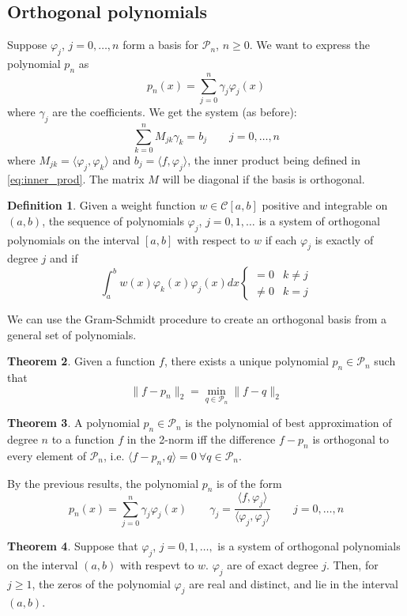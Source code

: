 \documentclass[12pt, openany]{report}
\theoremstyle{definition}
\newtheorem{thm}{Theorem}[chapter]
\newtheorem{definition}[thm]{Definition}
\begin{document}
\subsection{Orthogonal polynomials}
Suppose $\varphi_j$, $j=0,\dots,n$ form a basis for $\mathcal{P}_n$, $n\ge0$. We want to express the polynomial $p_n$ as 
\begin{equation}
    p_n(x) = \sum_{j=0}^n \gamma_j\varphi_j(x)
\end{equation}
where $\gamma_j$ are the coefficients. We get the system (as before):
\begin{equation}
    \sum_{k=0}^n M_{jk}\gamma_k = b_j \qquad j=0,\dots,n
\end{equation}
where $M_{jk} = \langle \varphi_j,\varphi_k\rangle$ and $b_j = \langle f,\varphi_j\rangle$, the inner product being defined in \eqref{eq:inner_prod}. The matrix $M$ will be diagonal if the basis is orthogonal. 
\begin{definition}
    Given a weight function $w\in \mathcal{C}[a,b]$ positive and integrable on $(a,b)$, the sequence of polynomials $\varphi_j$, $j=0,1,\dots$ is a system of orthogonal polynomials on the interval $[a,b]$ with respect to $w$ if each $\varphi_j$ is exactly of degree $j$ and if 
    \begin{equation}
        \int_a^b w(x)\varphi_k(x)\varphi_j(x) dx \begin{cases}
            = 0 & k\neq j\\
            \neq 0 & k=j
        \end{cases}
    \end{equation}
\end{definition}
We can use the Gram-Schmidt procedure to create an orthogonal basis from a general set of polynomials. 
\begin{thm}
    Given a function $f$, there exists a unique polynomial $p_n\in \mathcal{P}_n$ such that
    \begin{equation}
        \lVert f-p_n\rVert_2 = \min_{q\in \mathcal{P}_n} \lVert f-q\rVert_2
    \end{equation}
\end{thm}
\begin{thm}
    A polynomial $p_n\in \mathcal{P}_n$ is the polynomial of best approximation of degree $n$ to a function $f$ in the 2-norm iff the difference $f-p_n$ is orthogonal to every element of $\mathcal{P}_n$, i.e. $\langle f-p_n,q\rangle = 0\:\forall q\in \mathcal{P}_n$. 
\end{thm}
By the previous results, the polynomial $p_n$ is of the form 
\begin{equation}
    p_n(x) = \sum_{j=0}^n \gamma_j\varphi_j(x) \qquad \gamma_j = \frac{\langle f,\varphi_j\rangle}{\langle \varphi_j,\varphi_j\rangle} \qquad j=0,\dots,n
\end{equation}
\begin{thm}
    Suppose that $\varphi_j$, $j=0,1,\dots,$ is a system of orthogonal polynomials on the interval $(a,b)$ with respevt to $w$. $\varphi_j$ are of exact degree $j$. Then, for $j\ge1$, the zeros of the polynomial $\varphi_j$ are real and distinct, and lie in the interval $(a,b)$.
\end{thm}
\end{document}
